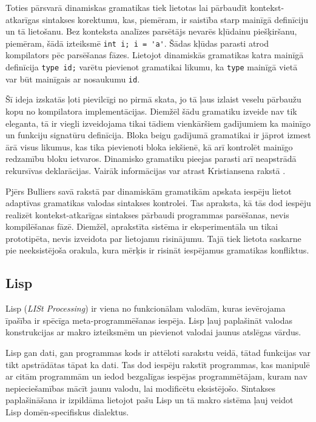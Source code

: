 Toties pārsvarā dinamiskas gramatikas tiek lietotas lai pārbaudīt kontekst-atkarīgas sintakses korektumu, kas, piemēram, ir saistība starp mainīgā definīciju un tā lietošanu. Bez konteksta analīzes parsētājs nevarēs kļūdainu piešķiršanu, piemēram,  šādā izteiksmē \verb|int i; i = 'a'|. Šādas kļūdas parasti atrod kompilators pēc parsēšanas fāzes. Lietojot dinamiskās gramatikas katra mainīgā definīcija \verb|type id;| varētu pievienot gramatikai likumu, ka \verb|type| mainīgā vietā var būt mainīgais ar nosaukumu \verb|id|.

Šī ideja izskatās ļoti pievilcīgi no pirmā skata, jo tā ļaus izlaist veselu pārbaužu kopu no kompilatora implementācijas. Diemžēl šādu gramatiku izveide nav tik eleganta, tā ir viegli izveidojama tikai tādiem vienkāršiem gadījumiem ka mainīgo un funkciju signatūru definīcija. Bloka beigu gadījumā gramatikai ir jāprot izmest ārā visus likumus, kas tika pievienoti bloka iekšienē, kā arī kontrolēt mainīgo redzamību bloku ietvaros. Dinamisko gramatiku pieejas parasti arī neapstrādā rekursīvas deklarācijas. Vairāk informācijas var atrast Kristiansena rakstā \cite{Christiansen:SurveyAdaptableGrammars}.

Pjērs Bulliers savā rakstā par dinamiskām gramatikām \cite{Boullier:DynamicGrammars} apskata iespēju lietot adaptīvas gramatikas valodas sintakses kontrolei. Tas apraksta, kā tās dod iespēju realizēt kontekst-atkarīgas sintakses pārbaudi programmas parsēšanas, nevis kompilēšanas fāzē. Diemžēl, aprakstīta sistēma ir eksperimentāla un tikai prototipēta, nevis izveidota par lietojamu risinājumu. Tajā tiek lietota saskarne pie neeksistējoša orakula, kura mērķis ir risināt iespējamus gramatikas konfliktus.

\subsection{\label{sbs:rel_lisp}Lisp}

Lisp (\emph{LISt Processing}) ir viena no funkcionālam valodām, kuras ievērojama īpašība ir spēcīga meta-programmēšanas iespēja. Lisp ļauj paplašināt valodas konstrukcijas ar makro izteiksmēm un pievienot valodai jaunus atslēgas vārdus.

Lisp gan dati, gan programmas kods ir attēloti sarakstu veidā, tātad funkcijas var tikt apstrādātas tāpat ka dati. Tas dod iespēju rakstīt programmas, kas manipulē ar citām programmām un iedod bezgalīgas iespējas programmētājam, kuram nav nepieciešamības mācīt jaunu valodu, lai modificētu eksistējošo. Sintakses paplašināšana ir izpildāma lietojot pašu Lisp un tā makro sistēma ļauj veidot Lisp domēn-specifiskus dialektus.

